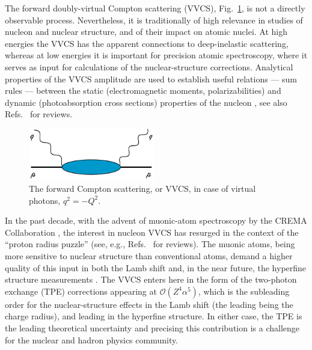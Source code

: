 \documentclass[12pt,preprint,tightenlines,
showpacs,preprintnumbers,amsmath,amssymb,
a4paper,nofootinbib]{revtex4-2}
\def\Figref#1{Fig.~\ref{fig:#1}}
\def\al{\alpha}
\begin{document}
The forward doubly-virtual 
Compton scattering (VVCS), \Figref{CSgeneric}, is not a directly observable process. Nevertheless, it 
is traditionally of high relevance in studies
of nucleon and nuclear structure, and of their impact on atomic nuclei. At high energies
the VVCS has the  apparent connections to deep-inelastic scattering, whereas 
at low energies it is important for precision atomic spectroscopy, where it serves as input for calculations of the nuclear-structure corrections. Analytical properties of the VVCS amplitude
are used to establish useful relations --- sum rules ---
between the static 
(electromagnetic moments, polarizabilities) 
and dynamic (photoabsorption cross sections) properties of the nucleon \cite{GellMann:1954db,Burkhardt:1970ti,Schwinger:1975uq,Bernabeu:1974mb,Lvov:1998vg},
see also Refs.~\cite{Drechsel:2002ar,Kuhn:2008sy,Holstein:2013kia,Hagelstein:2015egb,Pascalutsa:2018ced,Pasquini:2018wbl} for reviews. 

\begin{figure}[tbh]
\centering
       \includegraphics[width=5.5cm]{frwCSgeneric.pdf}
\caption{\small{The forward Compton scattering, or VVCS, in case of virtual photons, $q^2=-Q^2$.
  \label{fig:CSgeneric}}}
\end{figure}

In the past decade, with the advent of muonic-atom spectroscopy
by the CREMA Collaboration \cite{Pohl:2010zza,Antognini:1900ns,Pohl1:2016xoo},
the interest in nucleon VVCS has resurged in the context of 
the  ``proton radius puzzle'' (see, e.g., Refs.~\cite{Pohl:2013yb,Carlson:2015jba} for reviews).  
The muonic atoms, being more sensitive to nuclear structure than
conventional atoms, demand a higher quality of this input
in both the Lamb shift \cite{Pohl:2010zza,Antognini:1900ns} and, in the near future, the hyperfine structure measurements  \cite{Pohl:2016xsr,Bakalov:2015xya,Kanda:2018oay}. The VVCS  enters here in the form of the two-photon exchange (TPE) corrections appearing at $\mathcal{O}(Z^4\al^5)$, which is the subleading order for the nuclear-structure effects in the Lamb shift (the leading  being the  charge radius), and leading in the hyperfine structure. In either case, the TPE is the leading theoretical uncertainty and precising this contribution is a challenge for the nuclear and hadron
physics community.
\end{document}
